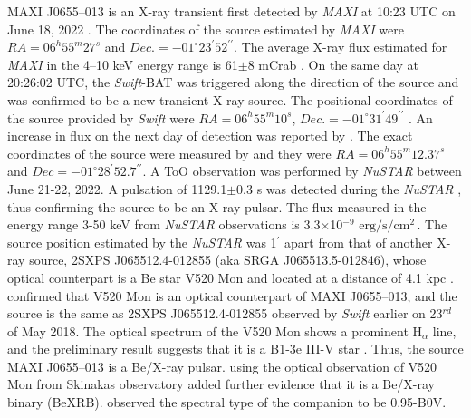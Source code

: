 \documentclass[12pt,a4paper,fleqn,usenatbib]{mnras}
\newcommand{\unitfl}{$\text{erg}/\text{s}/\text{cm}^{2}\,$}
\begin{document}
MAXI J0655--013 is an X-ray transient first detected by \emph{MAXI} at 10:23 UTC on June 18, 2022 \citep{2022ATel15442....1S}. The coordinates of the source estimated by \emph{MAXI} were $RA=06^{h}55^{m}27^{s}$ and $Dec.=-01^{\circ}23^{\prime}52^{\prime\prime}$. The average X-ray flux estimated for \emph{MAXI} in the 4–10 keV energy range is 61$\pm$8 mCrab \citep{2022ATel15442....1S}. On the same day at 20:26:02 UTC, the \emph{Swift}-BAT was triggered along the direction of the source \citep{2022ATel15443....1K} and was confirmed to be a new transient X-ray source. The positional coordinates of the source provided by \emph{Swift} were $RA=06^{h}55^{m}10^{s}$, $Dec.=-01^{\circ}31^{\prime}49^{\prime\prime}$ \citep{2022ATel15443....1K}. An increase in flux on the next day of detection was reported by \cite{2022ATel15453....1N}. The exact coordinates of the source were measured by \cite{2022ATel15564....1K} and they were $RA=06^{h}55^{m}12.37^{s}$ and $Dec=-01^{\circ}28^{\prime}52.7^{\prime\prime}$.
A ToO observation was performed by \emph{NuSTAR} between June 21-22, 2022. A pulsation of 1129.1$\pm$0.3 s was detected during the \emph{NuSTAR} \citep{2022ATel15495....1S}, thus confirming the source to be an X-ray pulsar. The flux measured in the energy range 3-50 keV from \emph{NuSTAR} observations is 3.3$\times$10$^{-9}$ \unitfl \citep{2022ATel15495....1S}. The source position estimated by the \emph{NuSTAR} was 1$^{\prime}$ apart from that of another X-ray source, 2SXPS J065512.4-012855 (aka SRGA J065513.5-012846), whose optical counterpart is a Be star V520 Mon and located at a distance of 4.1 kpc \citep{2022A&A...661A..38P}. \cite{2022ATel15561....1K} confirmed that V520 Mon is an optical counterpart of MAXI J0655--013, and the source is the same as 2SXPS J065512.4-012855 observed by \emph{Swift} earlier on 23$^{rd}$ of May 2018. The optical spectrum of the V520 Mon shows a prominent H$_{\alpha}$ line, and the preliminary result suggests that it is a B1-3e III-V star \citep{2022ATel15582....1Z}. Thus, the source MAXI J0655--013 is a Be/X-ray pulsar. \cite{2022ATel15612....1R} using the optical observation of V520 Mon from Skinakas observatory added further evidence that it is a Be/X-ray binary (BeXRB). \cite{2022ATel15612....1R} observed the spectral type of the companion to be 0.95-B0V.
\end{document}
